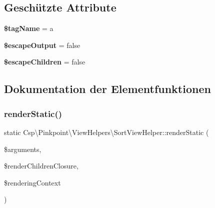 \subsection*{Geschützte Attribute}
\begin{DoxyCompactItemize}
\item 
\mbox{\label{classCsp_1_1Pinkpoint_1_1ViewHelpers_1_1SortViewHelper_a70d2030d68892f962b7843aaa7c6cfaf}} 
{\bfseries \$tag\+Name} = \textquotesingle{}a\textquotesingle{}
\item 
\mbox{\label{classCsp_1_1Pinkpoint_1_1ViewHelpers_1_1SortViewHelper_aa7b0bdc42e0ee1c8b65839b8d6527639}} 
{\bfseries \$escape\+Output} = false
\item 
\mbox{\label{classCsp_1_1Pinkpoint_1_1ViewHelpers_1_1SortViewHelper_a7380441b3eb2d5ff4f73b88a7cec513c}} 
{\bfseries \$escape\+Children} = false
\end{DoxyCompactItemize}


\subsection{Dokumentation der Elementfunktionen}
\mbox{\label{classCsp_1_1Pinkpoint_1_1ViewHelpers_1_1SortViewHelper_ad3fafc1688abf324fde3a39395c62831}} 
\subsubsection{\texorpdfstring{render\+Static()}{renderStatic()}}
{\footnotesize\ttfamily static Csp\textbackslash{}\+Pinkpoint\textbackslash{}\+View\+Helpers\textbackslash{}\+Sort\+View\+Helper\+::render\+Static (\begin{DoxyParamCaption}\item[{array}]{\$arguments,  }\item[{\textbackslash{}Closure}]{\$render\+Children\+Closure,  }\item[{Rendering\+Context\+Interface}]{\$rendering\+Context }\end{DoxyParamCaption})\hspace{0.3cm}{\ttfamily [static]}}

